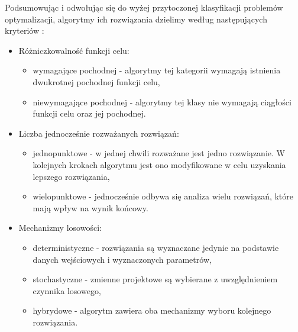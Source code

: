 Podsumowując i odwołując się do wyżej przytoczonej klasyfikacji problemów optymalizacji, algorytmy ich rozwiązania  dzielimy według następujących kryteriów \cite{Tesch2016}:
\begin{itemize}
	\item Różniczkowalność funkcji celu:
	\begin{itemize}
		\item wymagające pochodnej - algorytmy tej kategorii wymagają istnienia dwukrotnej pochodnej funkcji celu,
		\item niewymagające pochodnej - algorytmy tej klasy nie wymagają ciągłości funkcji celu oraz jej pochodnej.
	\end{itemize}
	\item Liczba jednocześnie rozważanych rozwiązań:
	\begin{itemize}
		\item jednopunktowe - w jednej chwili rozważane jest jedno rozwiązanie. W kolejnych krokach algorytmu jest ono modyfikowane w celu uzyskania lepszego rozwiązania,
		\item wielopunktowe - jednocześnie odbywa się analiza wielu rozwiązań, które mają wpływ na wynik końcowy.
	\end{itemize}
	\item Mechanizmy losowości:
	\begin{itemize}
		\item deterministyczne - rozwiązania są wyznaczane jedynie na podstawie danych wejściowych i wyznaczonych parametrów,
		\item stochastyczne - zmienne projektowe są wybierane z uwzględnieniem czynnika losowego,
		\item hybrydowe - algorytm zawiera oba mechanizmy wyboru kolejnego rozwiązania.
	\end{itemize}
\end{itemize}

